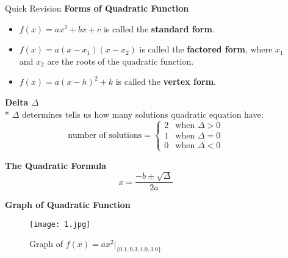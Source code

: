 \documentclass[final]{beamer}
\newlength{\sepwid}
\newlength{\onecolwid}
\newlength{\twocolwid}
\begin{document}
\begin{frame}[t]
\begin{columns}[t]
\begin{column}{\onecolwid}
\begin{block}{Quick Revision}
  \textbf{Forms of Quadratic Function}
  \begin{itemize}
  \item $f(x) = ax^2+bx+c$ is called the \textbf{standard form}.
  \item $f(x) = a(x-x_1)(x-x_2)$ is called the \textbf{factored form}, where $x_1$ and $x_2$ are the roots of the quadratic function.
  \item $f(x) = a(x-h)^2+k$ is called the \textbf{vertex form}.
  \end{itemize}
  
  \textbf{Delta $\Delta$}\\*
    $\Delta$ determines tells us how many solutions quadratic equation have:
    $$\text{number of solutions}=
    \begin{cases}
  2 &\text{when } \Delta > 0\\
  1 &\text{when } \Delta = 0\\
  0 &\text{when } \Delta < 0
  \end{cases}
  $$
    
    
    \textbf{The Quadratic Formula}
  $$x = \frac{-b\pm \sqrt{\Delta}}{2a}$$
    
    \textbf{Graph of Quadratic Function}
  
  \end{block}
  
    
    \begin{figure}
  \texttt{[image: 1.jpg]}
  \caption{Graph of $f(x)=ax^2|_{\{0.1, 0.3, 1.0, 3.0\}}$}
  \end{figure}
  
    
    \end{column} %
  
  \begin{column}{\sepwid}\end{column} %
  
  \begin{column}{\twocolwid} %
  
  \begin{columns}[t,totalwidth=\twocolwid] %
  
  \begin{column}{\onecolwid}\vspace{-.6in} %
  

\end{column}
\end{columns}
\end{column}
\end{columns}
\end{frame}
\end{document}

